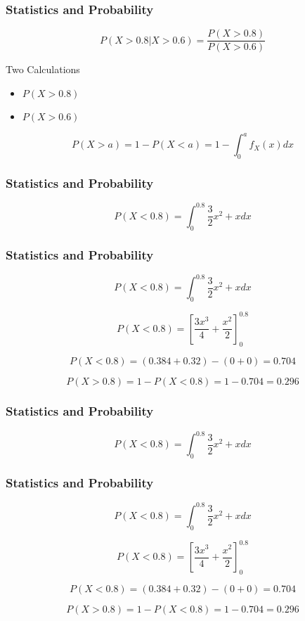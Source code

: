 \documentclass{beamer}
\begin{document}
\begin{frame}
\frametitle{Statistics and Probability}
\Large
\[  P(X >0.8 | X >0.6) = \frac{P(X >0.8)}{P(X >0.6)}    \]

Two Calculations
\begin{itemize}
\item $P(X >0.8)$
\item $P(X >0.6)$
\end{itemize}

\[P(X > a) =  1-P(X<a) = 1- \int^{a}_{0} f_X(x)dx\]
\end{frame}
\begin{frame}
\frametitle{Statistics and Probability}
\Large
\[P(X<0.8) = \int^{0.8}_{0} \frac{3}{2}x^2 + x dx   \]

\end{frame}
\begin{frame}
\frametitle{Statistics and Probability}
\Large
\[P(X<0.8) = \int^{0.8}_{0} \frac{3}{2}x^2 + x dx   \]

\[ P(X<0.8) = \left[ \frac{3x^3}{4}  + \frac{x^2}{2}\right]^{0.8}_{0}  \]

\[ P(X<0.8) = (0.384 + 0.32) - (0+0) = 0.704 \]

\[P(X>0.8) =  1 - P(X<0.8) = 1-0.704 = 0.296 \]

\end{frame}
\begin{frame}
\frametitle{Statistics and Probability}
\Large
\[P(X<0.8) = \int^{0.8}_{0} \frac{3}{2}x^2 + x dx   \]

\end{frame}
\begin{frame}
\frametitle{Statistics and Probability}
\Large
\[P(X<0.8) = \int^{0.8}_{0} \frac{3}{2}x^2 + x dx   \]

\[ P(X<0.8) = \left[ \frac{3x^3}{4}  + \frac{x^2}{2}\right]^{0.8}_{0}  \]

\[ P(X<0.8) = (0.384 + 0.32) - (0+0) = 0.704 \]

\[P(X>0.8) =  1 - P(X<0.8) = 1-0.704 = 0.296 \]

\end{frame}

\end{document}
